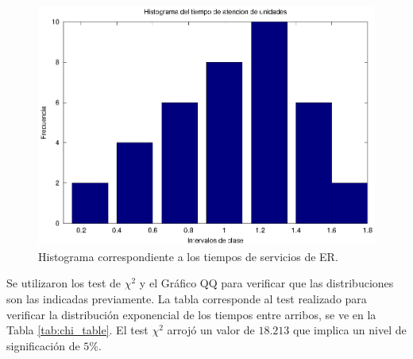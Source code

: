 \documentclass[a4paper,10pt]{article}
\begin{document}
\begin{figure}[ht]
\begin{center}
\includegraphics[width=12cm]{../src/parteA/hist_servicios.eps}
\caption{\label{fig:hist_servicios} Histograma correspondiente a los tiempos de servicios de ER.}
\end{center}
\end{figure}

Se utilizaron los test de  $\chi^2$ y el Gráfico QQ para verificar que las distribuciones son las indicadas previamente. La tabla corresponde al test realizado para verificar la distribución exponencial de los tiempos entre arribos, se ve en la Tabla \ref{tab:chi_table}. El test $\chi^2$ arrojó un valor de $18.213$ que implica un nivel de significación de $5\%$. 
\end{document}
